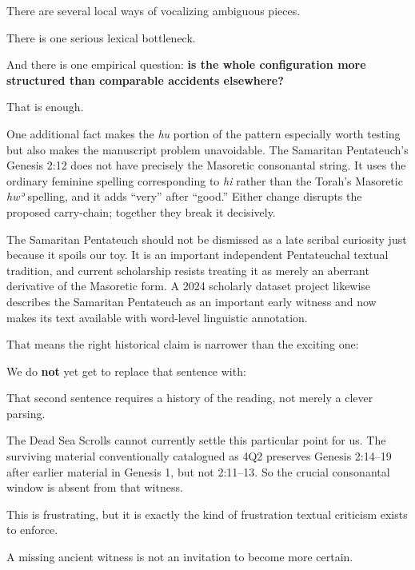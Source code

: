 There are several local ways of vocalizing ambiguous pieces.

There is one serious lexical bottleneck.

And there is one empirical question: \textbf{is the whole configuration more structured than comparable accidents elsewhere?}

That is enough.

One additional fact makes the \textit{hu} portion of the pattern especially worth testing but also makes the manuscript problem unavoidable. The Samaritan Pentateuch's Genesis 2:12 does not have precisely the Masoretic consonantal string. It uses the ordinary feminine spelling corresponding to \textit{hi} rather than the Torah's Masoretic \textit{hwʾ} spelling, and it adds ``very'' after ``good.'' Either change disrupts the proposed carry-chain; together they break it decisively.\cite{SamaritanGenesis}

The Samaritan Pentateuch should not be dismissed as a late scribal curiosity just because it spoils our toy. It is an important independent Pentateuchal textual tradition, and current scholarship resists treating it as merely an aberrant derivative of the Masoretic form. A 2024 scholarly dataset project likewise describes the Samaritan Pentateuch as an important early witness and now makes its text available with word-level linguistic annotation.\cite{Hjelm2020,Naaijer2024}

That means the right historical claim is narrower than the exciting one:


We do \textbf{not} yet get to replace that sentence with:


That second sentence requires a history of the reading, not merely a clever parsing.

The Dead Sea Scrolls cannot currently settle this particular point for us. The surviving material conventionally catalogued as 4Q2 preserves Genesis 2:14--19 after earlier material in Genesis 1, but not 2:11--13. So the crucial consonantal window is absent from that witness.\cite{Tov2012}

This is frustrating, but it is exactly the kind of frustration textual criticism exists to enforce.

A missing ancient witness is not an invitation to become more certain.

